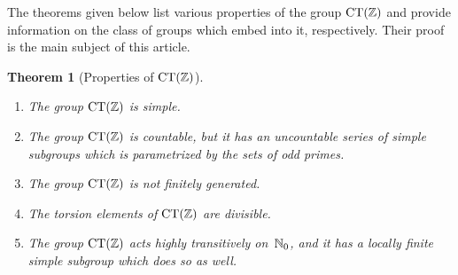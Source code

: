 \documentclass{amsart}
\theoremstyle{definition} \newtheorem{CTZDefinition}{Definition}[section]
\theoremstyle{plain}      \newtheorem{CTZPropertiesTheorem}[CTZDefinition]{Theorem}
\theoremstyle{plain}      \newtheorem{CTZSubgroupsTheorem}[CTZDefinition]{Theorem}
\theoremstyle{definition} \newtheorem{RcwaMappingDefinition}{Definition}[section]
\theoremstyle{definition} \newtheorem{RCWADefinition}[RcwaMappingDefinition]{Definition}
\theoremstyle{plain}      \newtheorem{CTZNotFinitelyGeneratedTheorem}
\theoremstyle{definition} \newtheorem{CTZSmEmbeddingDefinition}[RcwaMappingDefinition]{Definition}
\theoremstyle{plain}      \newtheorem{CTZHighlyTransitiveTheorem}[RcwaMappingDefinition]{Theorem}
\theoremstyle{plain}      \newtheorem{CTZTorsionElementsDivisibleTheorem}
\theoremstyle{plain}      \newtheorem{CTLemma}{Lemma}[section]
\theoremstyle{plain}      \newtheorem{IntegralCommutatorLemma}[CTLemma]{Lemma}
\theoremstyle{plain}      \newtheorem{NormalSubgroupContainsIntegralElementLemma}[CTLemma]{Lemma}
\theoremstyle{plain}      \newtheorem{CTZSimpleTheorem}[CTLemma]{Theorem}
\theoremstyle{remark}     \newtheorem{CTZSimpleRemark}[CTLemma]{Remark}
\theoremstyle{definition} \newtheorem{CTPZDefinition}[CTLemma]{Definition}
\theoremstyle{plain}      \newtheorem{CTPZSimpleCorollary}[CTLemma]{Corollary}
\theoremstyle{plain}      \newtheorem{CTPZSimpleProblem}[CTLemma]{Problem}
\theoremstyle{plain}      \newtheorem{FnPSL2ZEmbeddingTheorem}{Theorem}[section]
\theoremstyle{plain}      \newtheorem{FreeProductEmbeddingTheorem}[FnPSL2ZEmbeddingTheorem]{Theorem}
\theoremstyle{definition} \newtheorem{RestrictionMonomorphismDefinition}
\theoremstyle{plain}      \newtheorem{DirectAndWreathProductsEmbeddingTheorem}
\theoremstyle{plain}      \newtheorem{DirectAndWreathProductsEmbeddingCorollary}
\theoremstyle{definition} \newtheorem{CTintZDefinition}[FnPSL2ZEmbeddingTheorem]{Definition}
\theoremstyle{plain}      \newtheorem{CTintZSimpleTheorem}[FnPSL2ZEmbeddingTheorem]{Theorem}
\theoremstyle{definition} \newtheorem{KernelDefinition}{Definition}[section]
\theoremstyle{definition} \newtheorem{TameWildDefinition}[KernelDefinition]{Definition}
\theoremstyle{definition} \newtheorem{SimpleSupergroupsDefinition}[KernelDefinition]{Definition}
\theoremstyle{definition} \newtheorem{CSCRDefinition}[KernelDefinition]{Definition}
\theoremstyle{plain}      \newtheorem{SimpleSupergroupsGeneratorsTheorem}[KernelDefinition]{Theorem}
\theoremstyle{plain}      \newtheorem{SimpleSupergroupsTheorem}[KernelDefinition]{Theorem}
\theoremstyle{plain}      \newtheorem{SimpleSupergroupsTransitivityTheorem}
\theoremstyle{plain}      \newtheorem{TameGenerationConjecture}[KernelDefinition]{Conjecture}
\theoremstyle{remark}     \newtheorem{TameGenerationRemark}[KernelDefinition]{Remark}
\begin{document}
The theorems given below list various properties of the group \(\CT{\ZZ}\) and provide information
on the class of groups which embed into it, respectively. Their proof is the main subject of this
article.

\begin{CTZPropertiesTheorem}[Properties of \(\CT{\ZZ}\)] \label{CTZPropertiesTheorem}
  \verb| |
  \begin{enumerate}

    \item The group \(\CT{\ZZ}\) is simple.

    \item The group \(\CT{\ZZ}\) is countable, but it has an uncountable series of simple subgroups
          which is parametrized by the sets of odd primes.

    \item The group \(\CT{\ZZ}\) is not finitely generated.

    \item The torsion elements of \(\CT{\ZZ}\) are divisible.

    \item The group \(\CT{\ZZ}\) acts highly transitively on~\(\mathbb{N}_0\), and it has a locally
          finite simple subgroup which does so as well.

  \end{enumerate}
\end{CTZPropertiesTheorem}
\end{document}
